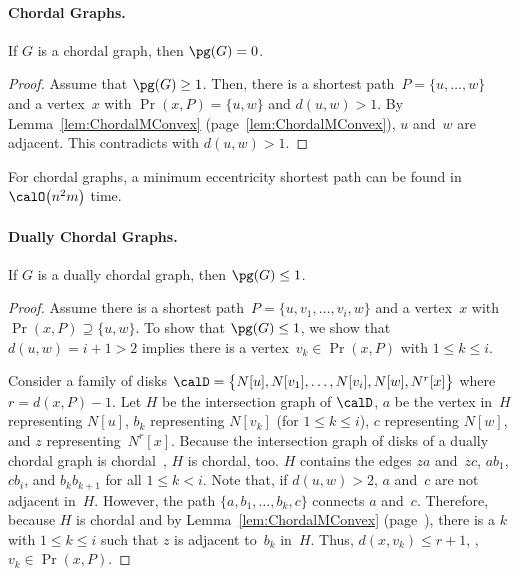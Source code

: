 \paragraph{Chordal Graphs.}

\begin{lemma}
If \( G \) is a chordal graph, then \( \pg(G) = 0 \).
\end{lemma}

\begin{proof}
Assume that $\pg(G) \geq 1$.
Then, there is a shortest path~$P = \{ u, \ldots, w \}$ and a vertex~$x$ with $\Pr(x, P) = \{ u, w \}$ and $d(u, w) > 1$.
By Lemma~\ref{lem:ChordalMConvex} (page~\ref{lem:ChordalMConvex}), $u$ and~$w$ are adjacent.
This contradicts with $d(u, w) > 1$.
\end{proof}

\begin{corollary}
    \label{cor:mespChordal}
For chordal graphs, a minimum eccentricity shortest path can be found in \( \calO \big( n^2 m \big) \) time.
\end{corollary}


\paragraph{Dually Chordal Graphs.}

\begin{lemma}
If \( G \) is a dually chordal graph, then \( \pg(G) \leq 1 \).
\end{lemma}

\begin{proof}
Assume there is a shortest path~$P = \{ u, v_1, \ldots, v_i , w \}$ and a vertex~$x$ with $\Pr(x, P) \supseteq \{ u, w \}$.
To show that $\pg(G) \leq 1$, we show that $d(u, w) = i + 1 > 2$ implies there is a vertex~$v_k \in \Pr(x, P)$ with $1 \leq k \leq i$.

Consider a family of disks $\calD = \big \{ N[u], N[v_{1}], \ldots, N[v_{i}], N[w], N^r[x]  \big \}$ where $r = d(x, P) - 1$.
Let $H$ be the intersection graph of $\calD$, $a$ be the vertex in~$H$ representing $N[u]$, $b_k$ representing $N[v_{k}]$ (for $1 \leq k \leq i$), $c$ representing $N[w]$, and $z$ representing~$N^r[x]$.
Because the intersection graph of disks of a dually chordal graph is chordal~\cite{BraDraCheVol1998}, $H$ is chordal, too.
$H$ contains the edges $za$ and~$zc$, $ab_1$, $cb_i$, and $b_kb_{k+1}$ for all $1 \leq k < i$.
Note that, if $d(u, w) > 2$, $a$ and~$c$ are not adjacent in~$H$.
However, the path $\{ a, b_1, \ldots, b_k, c \}$ connects $a$ and~$c$.
Therefore, because $H$ is chordal and by Lemma~\ref{lem:ChordalMConvex} (page~\pageref{lem:ChordalMConvex}), there is a $k$ with $1 \leq k \leq i$ such that $z$ is adjacent to~$b_k$ in~$H$.
Thus, $d(x, v_k) \leq r + 1$, \ie, $v_k \in \Pr(x, P)$.
\end{proof}

